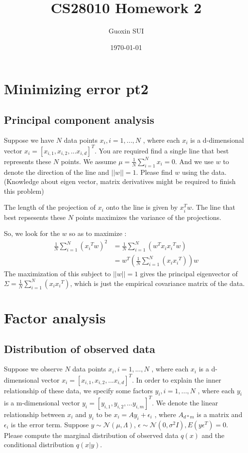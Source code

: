 \documentclass{article}
\title{CS28010 Homework 2}
\author{Guoxin SUI}
\date{\today}
\newenvironment{answer}{\par\color{ForestGreen}}{\par}
\begin{document}
\maketitle

\section{Minimizing error pt2}
\subsection{Principal component analysis}
Suppose we have $N$ data points $x_i , i = 1,... , N$ , where each $x_i$ is a d-dimensional vector
$x_i = [x_{i,1}, x_{i,2},... x_{i,d}]^T$. You are required find a single line that best represents these $N$
points. We assume $\mu = \frac{1}{N} \sum_{i=1}^Nx_i = 0$.
And we use $w$ to denote the direction of the line and $||w|| = 1$. Please find $w$ using the data. (Knowledge about eigen vector, matrix derivatives might be required to finish this problem)
\begin{answer}
The length of the projection of $x_i$ onto the line is given by $x_i^Tw$. The line that best repsesents these $N$ points maximizes the variance of the projections.

So, we look for the $w$ so as to maximize : \begin{align*}
    \frac{1}{N} \sum_{i=1}^N({x_i}^Tw)^2 &= \frac{1}{N} \sum_{i=1}^N(w^Tx_i{x_i}^Tw) \\
                                         &= w^T\left(\frac{1}{N} \sum_{i=1}^N(x_i{x_i}^T)\right)w
     \end{align*}
The maximization of this subject to $||w|| = 1$ gives the principal eigenvector of $\Sigma = \frac{1}{N} \sum_{i=1}^N(x_i{x_i}^T)$, which is just the empirical covariance matrix of the data.

\end{answer}

\section{Factor analysis}
\subsection{Distribution of observed data}
Suppose we observe $N$ data points $x_i , i = 1,... , N$ , where each $x_i$ is a d-dimensional vector
$x_i = [x_{i,1}, x_{i,2},... x_{i,d}]^T$.
In order to explain the inner relationship of these data,
we specify some factors $y_i , i = 1,... , N$ ,
where each $y_i$ is a m-dimensional vector $y_i = [y_{i,1}, y_{i,2},... y_{i,m}]^T$.
We denote the linear relationship between $x_i$ and $y_i$ to be $x_i = Ay_i + \epsilon_i $ ,
where $A_{d*m}$ is a matrix
and $ \epsilon_i $ is the error term.
Suppose $y \sim \mathcal{N} (\mu, \Lambda)$, $\epsilon \sim \mathcal{N} (0, \sigma^2I), E(y\epsilon^T ) = 0$. Please compute the marginal distribution of observed data
$q(x)$ and the conditional distribution $q(x|y)$.
\begin{answer}

\end{answer}
\end{document}
